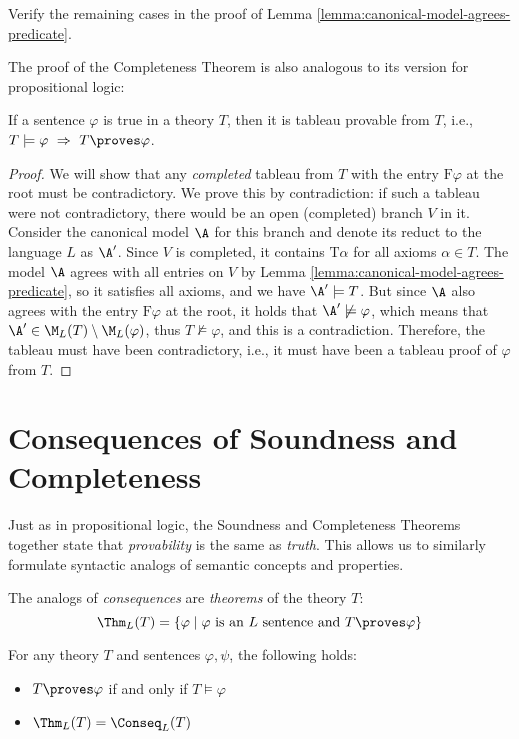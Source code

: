 \begin{exercise}
    Verify the remaining cases in the proof of Lemma \ref{lemma:canonical-model-agrees-predicate}.
\end{exercise}

The proof of the Completeness Theorem is also analogous to its version for propositional logic:

\begin{theorem}[On Completeness]\label{theorem:completeness-theorem-predicate}
    If a sentence $\varphi$ is true in a theory $T$, then it is tableau provable from $T$, i.e., $T\models\varphi\ \Rightarrow\ T\proves\varphi$.    
\end{theorem} 

\begin{proof}
We will show that any \emph{completed} tableau from $T$ with the entry $\mathrm{F}\varphi$ at the root must be contradictory. We prove this by contradiction: if such a tableau were not contradictory, there would be an open (completed) branch $V$ in it. Consider the canonical model $\A$ for this branch and denote its reduct to the language $L$ as $\A'$. Since $V$ is completed, it contains $\mathrm{T}\alpha$ for all axioms $\alpha\in T$. The model $\A$ agrees with all entries on $V$ by Lemma \ref{lemma:canonical-model-agrees-predicate}, so it satisfies all axioms, and we have $\A'\models T$. But since $\A$ also agrees with the entry $\mathrm{F}\varphi$ at the root, it holds that $\A'\not\models\varphi$, which means that $\A'\in \M_L(T)\setminus\M_L(\varphi)$, thus $T\not\models\varphi$, and this is a contradiction. Therefore, the tableau must have been contradictory, i.e., it must have been a tableau proof of $\varphi$ from $T$.
\end{proof}


\section{Consequences of Soundness and Completeness}

Just as in propositional logic, the Soundness and Completeness Theorems together state that \emph{provability} is the same as \emph{truth}. This allows us to similarly formulate syntactic analogs of semantic concepts and properties.

The analogs of \emph{consequences} are \emph{theorems} of the theory $T$:
$$
\Thm_L(T)=\{\varphi\mid \varphi\text{ is an $L$ sentence and } T\proves\varphi\}
$$

\begin{corollary}[Provability = Truth]\label{corollary:corollary-of-soundness-and-completeness-predicate}
    For any theory $T$ and sentences $\varphi,\psi$, the following holds:
    \begin{itemize}
        \item $T\proves\varphi$ if and only if $T\models\varphi$
        \item $\Thm_L(T)=\Conseq_L(T)$
    \end{itemize}
\end{corollary}

